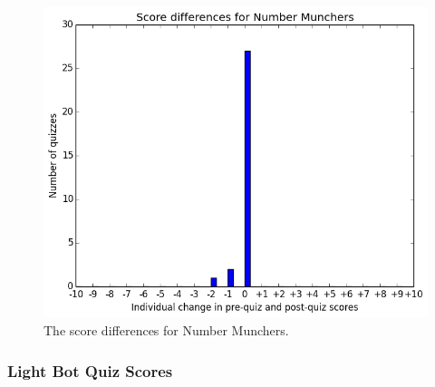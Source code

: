 			\begin{figure}[h] 
			\centering 
			\includegraphics[height=0.33\textheight]{munchers_results.png} 
			\caption{The score differences for Number Munchers.}
			\end{figure}


\cleardoublepage

		\subsubsection{Light Bot Quiz Scores}

			

